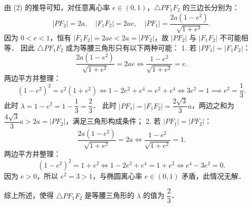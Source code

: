 \begin{answer}
由 (2) 的推导可知，对任意离心率 $e \in (0, 1)$，$\triangle PF_1F_2$ 的三边长分别为：
\nopagebreak[4]
\[
|PF_2| = 2a, \quad |F_1F_2| = 2ae, \quad |PF_1| = \frac{2a(1 - e^2)}{\sqrt{1 + e^2}}.
\]
因为 $0 < e < 1$，恒有 $|F_1F_2| = 2ae < 2a = |PF_2|$，故 $|PF_2|$ 与 $|F_1F_2|$ 不可能相等．
因此 $\triangle PF_1F_2$ 成为等腰三角形只有以下两种可能：
1. 若 $|PF_1| = |F_1F_2|$：
\nopagebreak[4]
\[
\frac{2a(1 - e^2)}{\sqrt{1 + e^2}} = 2ae \iff \frac{1 - e^2}{\sqrt{1 + e^2}} = e.
\]
   两边平方并整理：
\nopagebreak[4]
\[
(1 - e^2)^2 = e^2(1 + e^2) \iff 1 - 2e^2 + e^4 = e^2 + e^4 \iff 3e^2 = 1 \implies e^2 = \frac{1}{3}.
\]
   此时 $\lambda = 1 - e^2 = 1 - \dfrac{1}{3} = \dfrac{2}{3}$．
   此时 $|PF_1| = |F_1F_2| = \dfrac{2\sqrt{3}}{3}a$，两边之和为 $\dfrac{4\sqrt{3}}{3}a > 2a = |PF_2|$，满足三角形构成条件；
2. 若 $|PF_1| = |PF_2|$：
\nopagebreak[4]
\[
\frac{2a(1 - e^2)}{\sqrt{1 + e^2}} = 2a \iff \frac{1 - e^2}{\sqrt{1 + e^2}} = 1.
\]
   两边平方并整理：
\nopagebreak[4]
\[
(1 - e^2)^2 = 1 + e^2 \iff 1 - 2e^2 + e^4 = 1 + e^2 \iff e^4 - 3e^2 = 0.
\]
   因为 $e > 0$，所以 $e^2 = 3 > 1$，与椭圆离心率 $e \in (0, 1)$ 矛盾，此情况无解．

综上所述，使得 $\triangle PF_1F_2$ 是等腰三角形的 $\lambda$ 的值为 $\dfrac{2}{3}$．




\end{answer}